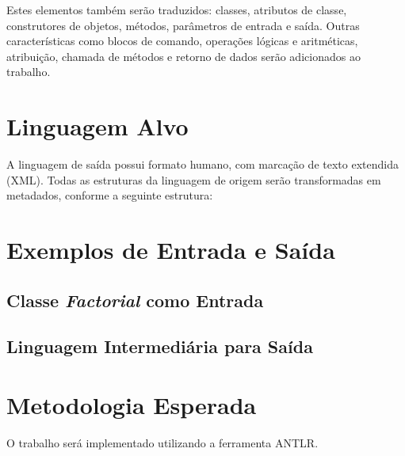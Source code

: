 \documentclass{article}
\begin{document}
Estes elementos também serão traduzidos: classes, atributos de classe,
construtores de objetos, métodos, parâmetros de entrada e saída. Outras
características como blocos de comando, operações lógicas e aritméticas,
atribuição, chamada de métodos e retorno de dados serão adicionados ao trabalho.

\section{Linguagem Alvo}

A linguagem de saída possui formato humano, com marcação de texto extendida
(XML). Todas as estruturas da linguagem de origem serão transformadas em
metadados, conforme a seguinte estrutura:

\begin{footnotesize}
    
\end{footnotesize}

\section{Exemplos de Entrada e Saída}

\subsection{Classe \emph{Factorial} como Entrada}

\begin{footnotesize}
    
\end{footnotesize}

\subsection{Linguagem Intermediária para Saída}

\begin{footnotesize}
    
\end{footnotesize}

\section{Metodologia Esperada}

O trabalho será implementado utilizando a ferramenta ANTLR.
\end{document}
